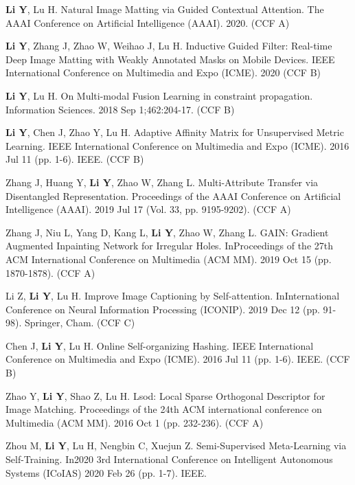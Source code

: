 

\begin{publications}
  \item {\bf{Li Y}}, Lu H. Natural Image Matting via Guided Contextual Attention. The AAAI Conference on Artificial Intelligence (AAAI). 2020. (CCF A)
  \item {\bf{Li Y}}, Zhang J, Zhao W, Weihao J, Lu H. Inductive Guided Filter: Real-time Deep Image Matting with Weakly Annotated Masks on Mobile Devices. IEEE International Conference on Multimedia and Expo (ICME). 2020  (CCF B)
  \item {\bf{Li Y}}, Lu H. On Multi-modal Fusion Learning in constraint propagation. Information Sciences. 2018 Sep 1;462:204-17. (CCF B)
  \item {\bf{Li Y}}, Chen J, Zhao Y, Lu H. Adaptive Affinity Matrix for Unsupervised Metric Learning. IEEE International Conference on Multimedia and Expo (ICME). 2016 Jul 11 (pp. 1-6). IEEE. (CCF B)
  \item Zhang J, Huang Y, {\bf{Li Y}}, Zhao W, Zhang L. Multi-Attribute Transfer via Disentangled Representation. Proceedings of the AAAI Conference on Artificial Intelligence (AAAI). 2019 Jul 17 (Vol. 33, pp. 9195-9202). (CCF A)
  \item Zhang J, Niu L, Yang D, Kang L, {\bf{Li Y}}, Zhao W, Zhang L. GAIN: Gradient Augmented Inpainting Network for Irregular Holes. InProceedings of the 27th ACM International Conference on Multimedia (ACM MM). 2019 Oct 15 (pp. 1870-1878). (CCF A)
  \item Li Z, {\bf{Li Y}}, Lu H. Improve Image Captioning by Self-attention. InInternational Conference on Neural Information Processing (ICONIP). 2019 Dec 12 (pp. 91-98). Springer, Cham. (CCF C)
  \item Chen J, {\bf{Li Y}}, Lu H. Online Self-organizing Hashing. IEEE International Conference on Multimedia and Expo (ICME). 2016 Jul 11 (pp. 1-6). IEEE. (CCF B)
  \item Zhao Y, {\bf{Li Y}}, Shao Z, Lu H. Lsod: Local Sparse Orthogonal Descriptor for Image Matching. Proceedings of the 24th ACM international conference on Multimedia (ACM MM). 2016 Oct 1 (pp. 232-236). (CCF A)
  \item Zhou M, {\bf{Li Y}}, Lu H, Nengbin C, Xuejun Z. Semi-Supervised Meta-Learning via Self-Training. In2020 3rd International Conference on Intelligent Autonomous Systems (ICoIAS) 2020 Feb 26 (pp. 1-7). IEEE.
\end{publications}

